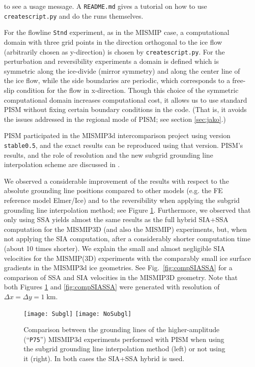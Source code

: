 \noindent to see a usage message.  A \texttt{README.md} gives a tutorial on how to use \texttt{createscript.py} and do the runs themselves.

For the flowline \texttt{Stnd} experiment, as in the MISMIP case, a computational domain with three grid points in the direction orthogonal to the ice flow (arbitrarily chosen as y-direction) is chosen by \texttt{createscript.py}.  For the perturbation and reversibility experiments a domain is defined which is symmetric along the ice-divide (mirror symmetry) and along the center line of the ice flow, while the side boundaries are periodic, which corresponds to a free-slip condition for the flow in x-direction. Though this choice of the symmetric computational domain increases computational cost, it allows us to use standard PISM without fixing certain boundary conditions in the code.  (That is, it avoids the issues addressed in the regional mode of PISM; see section \ref{sec:jako}.)

PISM participated in the MISMIP3d intercomparison project \cite{MISMIP3d2013} using version \texttt{stable0.5}, and the exact results can be reproduced using that version.  PISM's results, and the role of resolution and the new subgrid grounding line interpolation scheme are discussed in \cite{Feldmannetal2014}.

We observed a considerable improvement of the results with respect to the absolute grounding line positions compared to other models (e.g. the FE reference model Elmer/Ice) and to the reversibility when applying the subgrid grounding line interpolation method; see Figure \ref{fig:Subgl}.  Furthermore, we observed that only using SSA yields almost the same results as the full hybrid SIA+SSA computation for the MISMIP3D (and also the MISMIP) experiments, but, when not applying the SIA computation, after a considerably shorter computation time (about 10 times shorter).  We explain the small and almost negligible SIA velocities for the MISMIP(3D) experiments with the comparably small ice surface gradients in the MISMIP3d ice geometries.  See Fig.~\ref{fig:compSIASSA} for a comparison of SSA and SIA velocities in the MISMIP3D geometry.  Note that both Figures \ref{fig:Subgl} and \ref{fig:compSIASSA} were generated with resolution of $\Delta x = \Delta y = 1\;$km.

\begin{figure}[ht]
\centering
\texttt{[image: Subgl]}
\texttt{[image: NoSubgl]}
\caption{Comparison between the grounding lines of the higher-amplitude (``\texttt{P75}'') MISMIP3d experiments performed with PISM when using the subgrid grounding line interpolation method (left) or not using it (right).  In both cases the SIA+SSA hybrid is used.}
\label{fig:Subgl}
\end{figure}

